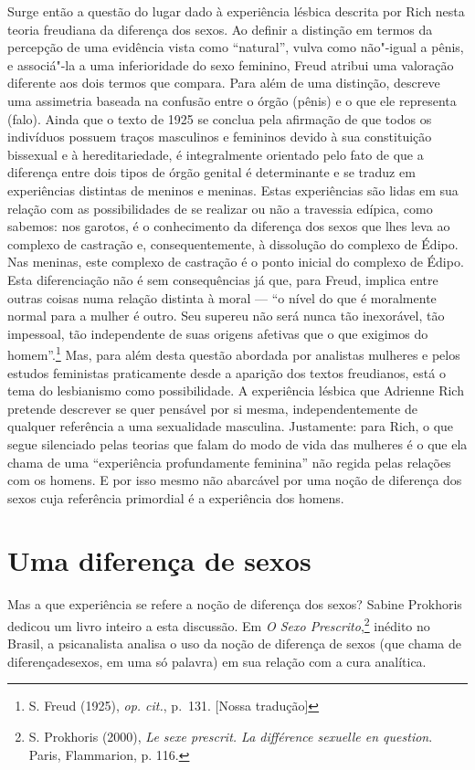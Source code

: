 Surge então a questão do lugar dado à experiência lésbica descrita por
Rich nesta teoria freudiana da diferença dos sexos. Ao definir a
distinção em termos da percepção de uma evidência vista como
``natural'', vulva como não"-igual a pênis, e associá"-la a uma
inferioridade do sexo feminino, Freud atribui uma valoração diferente
aos dois termos que compara. Para além de uma distinção, descreve uma
assimetria baseada na confusão entre o órgão (pênis) e o que ele
representa (falo). Ainda que o texto de 1925 se conclua pela afirmação
de que todos os indivíduos possuem traços masculinos e femininos devido
à sua constituição bissexual e à hereditariedade, é integralmente
orientado pelo fato de que a diferença entre dois tipos de órgão genital
é determinante e se traduz em experiências distintas de meninos e
meninas. Estas experiências são lidas em sua relação com as
possibilidades de se realizar ou não a travessia edípica, como sabemos:
nos garotos, é o conhecimento da diferença dos sexos que lhes leva ao
complexo de castração e, consequentemente, à dissolução do complexo de
Édipo. Nas meninas, este complexo de castração é o ponto inicial do
complexo de Édipo. Esta diferenciação não é sem consequências já que,
para Freud, implica entre outras coisas numa relação distinta à moral ---
``o nível do que é moralmente normal para a mulher é outro. Seu supereu
não será nunca tão inexorável, tão impessoal, tão independente de suas
origens afetivas que o que exigimos do homem''.\footnote{S. Freud (1925),
  \emph{op. cit.}, p.~131. {[}Nossa tradução{]}} Mas, para além desta
questão abordada por analistas mulheres e pelos estudos feministas
praticamente desde a aparição dos textos freudianos, está o tema do
lesbianismo como possibilidade. A experiência lésbica que Adrienne Rich
pretende descrever se quer pensável por si mesma, independentemente de
qualquer referência a uma sexualidade masculina. Justamente: para Rich,
o que segue silenciado pelas teorias que falam do modo de vida das
mulheres é o que ela chama de uma ``experiência profundamente feminina''
não regida pelas relações com os homens. E por isso mesmo não abarcável
por uma noção de diferença dos sexos cuja referência primordial é a
experiência dos homens.

\section{Uma diferença de sexos}

Mas a que experiência se refere a noção de diferença dos sexos? Sabine
Prokhoris dedicou um livro inteiro a esta discussão. Em \emph{O Sexo
Prescrito},\footnote{S. Prokhoris (2000), \emph{Le sexe prescrit. La
  différence sexuelle en question}. Paris, Flammarion, p. 116.} inédito
no Brasil, a psicanalista analisa o uso da noção de diferença de sexos
(que chama de diferençadesexos, em uma só palavra) em sua relação com a
cura analítica.

